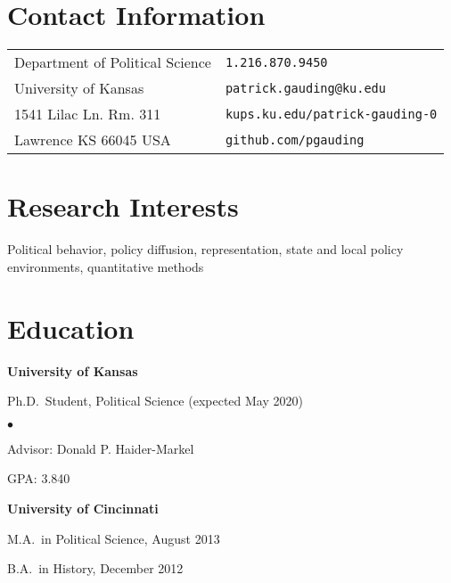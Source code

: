 \documentclass[margin,line,pifont,palatino,courier]{res}
\newenvironment{list1}{
  \begin{list}{\ding{113}}{%
      \setlength{\itemsep}{0in}
      \setlength{\parsep}{0in} \setlength{\parskip}{0in}
      \setlength{\topsep}{0in} \setlength{\partopsep}{0in}
      \setlength{\leftmargin}{0.17in}}}{\end{list}}
\newenvironment{list2}{
  \begin{list}{$\bullet$}{%
      \setlength{\itemsep}{0in}
      \setlength{\parsep}{0in} \setlength{\parskip}{0in}
      \setlength{\topsep}{0in} \setlength{\partopsep}{0in}
      \setlength{\leftmargin}{0.2in}}}{\end{list}}
\begin{document}

\begin{resume}

\section{\sc Contact Information}

\vspace{.05in}
\begin{tabular}{@{}p{2.75in}p{2in}}
Department of Political Science & \verb+1.216.870.9450+ \\
University of Kansas            & \verb+patrick.gauding@ku.edu+\\
1541 Lilac Ln. Rm. 311          & \verb+kups.ku.edu/patrick-gauding-0+\\
Lawrence KS 66045 USA           & \verb+github.com/pgauding+\\
\end{tabular}

\section{\sc Research Interests}
Political behavior, policy diffusion, representation, state and local
policy environments, quantitative methods

\section{\sc Education}

{\bf University of Kansas}\\
\begin{list1}
\item[] Ph.D.~Student, Political Science (expected May 2020)

\begin{list2}
\vspace*{.05in}
\item Advisor: Donald P. Haider-Markel
\item GPA: 3.840
\end{list2}
\end{list1}

{\bf University of Cincinnati}\\
\begin{list1}
\item[] M.A.~in Political Science, August 2013
\item[] B.A.~in History, December 2012


\end{list1}
\end{resume}
\end{document}
